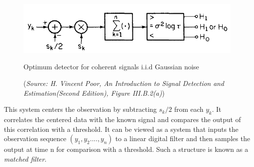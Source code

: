 \documentclass[a4paper,english,12pt]{article}
\begin{document}
\begin{exmp}
\begin{figure}[h]
\centering
\captionsetup{justification=centering}
\includegraphics[width=0.8\linewidth]{Figures/lec10Fig1}
\caption{Optimum detector for coherent signals i.i.d Gaussian noise}
\caption*{\footnotesize(\textit{Source: H. Vincent Poor, An Introduction to Signal Detection and Estimation(Second Edition), Figure	 III.B.2(a)})}
\label{fig:Fig1}
\end{figure}
\par This system centers the observation by subtracting $s_{k}/2$ from each $y_{k}$. It correlates the centered data with the known signal and compares the output of this correlation with a threshold. It can be viewed as a system that inputs the observation sequence $(y_{1}, y_{2}....,y_{n})$ to a linear digital filter and then samples the output at time n for comparison with a threshold. Such a structure is known as a {\it matched filter}.
\end{exmp}
\end{document}
